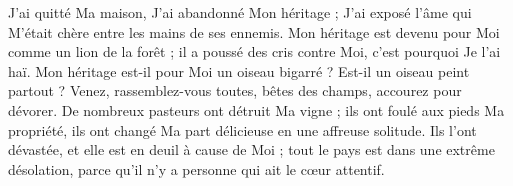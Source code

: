 J'ai quitté Ma maison, J'ai abandonné Mon héritage ; J'ai exposé l'âme qui M'était chère entre les mains de ses ennemis.
Mon héritage est devenu pour Moi comme un lion de la forêt ; il a poussé des cris contre Moi, c'est pourquoi Je l'ai haï.
Mon héritage est-il pour Moi un oiseau bigarré ? Est-il un oiseau peint partout ? Venez, rassemblez-vous toutes, bêtes des champs, accourez pour dévorer.
De nombreux pasteurs ont détruit Ma vigne ; ils ont foulé aux pieds Ma propriété, ils ont changé Ma part délicieuse en une affreuse solitude.
Ils l'ont dévastée, et elle est en deuil à cause de Moi ; tout le pays est dans une extrême désolation, parce qu'il n'y a personne qui ait le cœur attentif.
